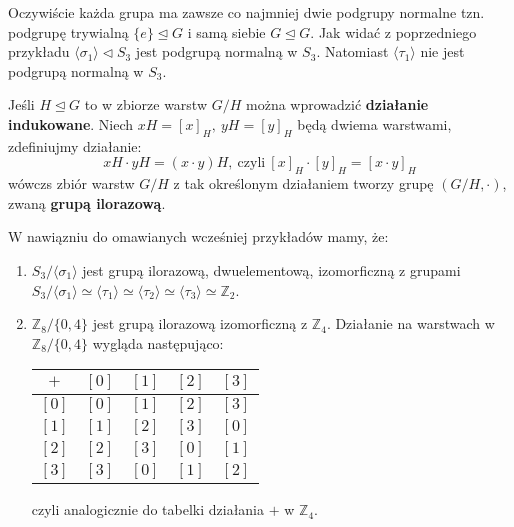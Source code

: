 \begin{przyk}
Oczywiście każda grupa ma zawsze co najmniej dwie podgrupy normalne tzn. podgrupę trywialną $\{e\}\unlhd G$ i samą siebie $G\unlhd G$. Jak widać z poprzedniego przykładu $\langle\sigma_1\rangle\lhd S_3$ jest podgrupą normalną w $S_3$. Natomiast $\langle\tau_1\rangle$ nie jest podgrupą normalną w $S_3$.
\end{przyk}

\begin{df}
Jeśli $H\unlhd G$ to w zbiorze warstw $G/H$ można wprowadzić \textbf{działanie indukowane}. Niech $xH=[x]_H,\ yH=[y]_H$ będą dwiema warstwami, zdefiniujmy działanie: $$xH\cdot yH=(x\cdot y)H,\ \textrm{czyli}\ [x]_H\cdot [y]_H=[x\cdot y]_H$$ wówczs zbiór warstw $G/H$ z tak określonym działaniem tworzy grupę $(G/H,\cdot)$, zwaną \textbf{grupą ilorazową}.
\end{df}

\begin{przyk}
W nawiązniu do omawianych wcześniej przykładów mamy, że:
\begin{enumerate}[\rm(1)]
\item
$S_3/\langle\sigma_1\rangle$ jest grupą ilorazową, dwuelementową, izomorficzną z grupami $S_3/\langle\sigma_1\rangle\simeq\langle\tau_1\rangle\simeq\langle\tau_2\rangle\simeq\langle\tau_3\rangle\simeq\mathbb{Z}_2$.
\item
$\mathbb{Z}_8/\{0,4\}$ jest grupą ilorazową izomorficzną z $\mathbb{Z}_4$. Działanie na warstwach w $\mathbb{Z}_8/\{0,4\}$ wygląda następująco:
\begin{center}
\begin{tabular}{c|cccc}
$+$ & $[0]$ & $[1]$ & $[2]$ & $[3]$\\
\hline
$[0]$ & $[0]$ & $[1]$ & $[2]$ & $[3]$\\
$[1]$ & $[1]$ & $[2]$ & $[3]$ & $[0]$\\
$[2]$ & $[2]$ & $[3]$ & $[0]$ & $[1]$\\
$[3]$ & $[3]$ & $[0]$ & $[1]$ & $[2]$
\end{tabular}
\end{center}
czyli analogicznie do tabelki działania $+$ w $\mathbb{Z}_4$.
\end{enumerate}
\end{przyk}


